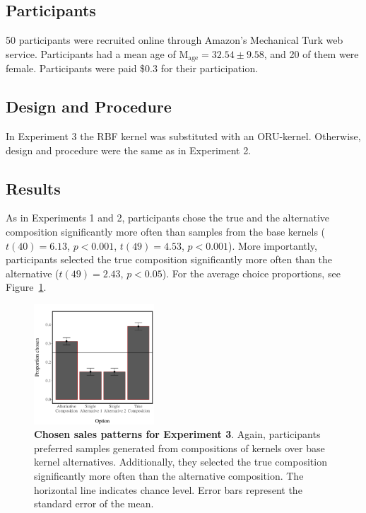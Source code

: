 \documentclass[10pt,letterpaper]{article}
\begin{document}
\subsection{Participants}
50 participants were recruited online through Amazon's Mechanical Turk web service. Participants had a mean age of M$_\text{age}=32.54 \pm 9.58$, and 20 of them were female. Participants were paid \$0.3 for their participation. 

\subsection{Design and Procedure}
In Experiment 3 the RBF kernel was substituted with an ORU-kernel. Otherwise, design and procedure were the same as in Experiment 2.

\subsection{Results}
As in Experiments 1 and 2, participants chose the true and the alternative composition significantly more often than samples from the base kernels ($t(40)= 6.13$, $p<0.001$, $t(49)=4.53$, $p<0.001$). More importantly, participants selected the true composition significantly more often than the alternative ($t(49)= 2.43$, $p<0.05$). %
For the average choice proportions, see Figure~\ref{fig:results3}.
\begin{figure}[ht!]
\centering
\includegraphics[width=0.4\textwidth]{results3.pdf}
\caption{\textbf{Chosen sales patterns for Experiment 3}. Again, participants preferred samples generated from compositions of kernels over base kernel alternatives. Additionally, they selected the true composition significantly more often than the alternative composition. The horizontal line indicates chance level. Error bars represent the standard error of the mean.}
\label{fig:results3}
\end{figure}
\end{document}
